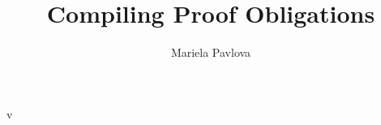 \documentclass[a4paper]{article}
\title{Compiling Proof Obligations }
\author{Mariela Pavlova}
\begin{document}
\maketitle
\tableofcontents
\newpage 
   
v
   
   
   
	 

   
	  
	 
	 


    
          	  
   
 
   
 
  
    


\end{document}
